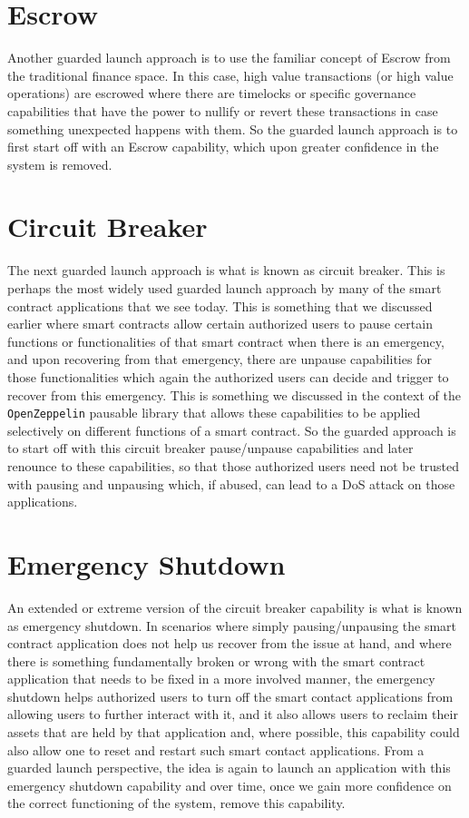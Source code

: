 \section{Escrow}
Another guarded launch approach is to use the familiar concept of Escrow from the traditional finance space. In this case, high value transactions (or high value operations) are escrowed where there are timelocks or specific governance capabilities that have the power to nullify or revert these transactions in case something unexpected happens with them. So the guarded launch approach is to first start off with an Escrow capability, which upon greater confidence in the system is removed.

\section{Circuit Breaker}
The next guarded launch approach is what is known as circuit breaker. This is perhaps the most widely used guarded launch approach by many of the smart contract applications that we see today. This is something that we discussed earlier where smart contracts allow certain authorized users to pause certain functions or functionalities of that smart contract when there is an emergency, and upon recovering from that emergency, there are unpause capabilities for those functionalities which again the authorized users can decide and trigger to recover from this emergency. This is something we discussed in the context of the \verb|OpenZeppelin| pausable library that allows these capabilities to be applied selectively on different functions of a smart contract. So the guarded approach is to start off with this circuit breaker pause/unpause capabilities and later renounce to these capabilities, so that those authorized users need not be trusted with pausing and unpausing which, if abused, can lead to a DoS attack on those applications.

\section{Emergency Shutdown}
An extended or extreme version of the circuit breaker capability is what is known as emergency shutdown. In scenarios where simply pausing/unpausing the smart contract application does not help us recover from the issue at hand, and where there is something fundamentally broken or wrong with the smart contract application that needs to be fixed in a more involved manner, the emergency shutdown helps authorized users to turn off the smart contact applications from allowing users to further interact with it, and it also allows users to reclaim their assets that are held by that application and, where possible, this capability could also allow one to reset and restart such smart contact applications. From a guarded launch perspective, the idea is again to launch an application with this emergency shutdown capability and over time, once we gain more confidence on the correct functioning of the system, remove this capability.\\

